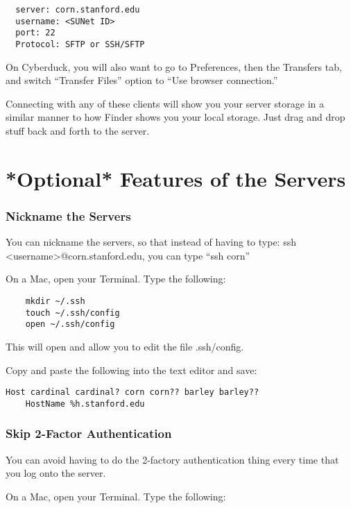 \documentclass[12pt]{article}
\begin{document}
\begin{lstlisting}
  server: corn.stanford.edu
  username: <SUNet ID>
  port: 22
  Protocol: SFTP or SSH/SFTP
\end{lstlisting}

On Cyberduck, you will also want to go to Preferences, then the Transfers tab, and switch ``Transfer Files'' option to ``Use browser connection.''

Connecting with any of these clients will show you your server storage in a similar manner to how Finder shows you your local storage. Just drag and drop stuff back and forth to the server.



\section{*Optional* Features of the Servers}


\subsubsection{Nickname the Servers}

You can nickname the servers, so that instead of having to type: ssh <username>@corn.stanford.edu, you can type ``ssh corn''

On a Mac, open your Terminal. Type the following:

\begin{lstlisting}
	mkdir ~/.ssh
	touch ~/.ssh/config
	open ~/.ssh/config
\end{lstlisting}

This will open and allow you to edit the file .ssh/config.

Copy and paste the following into the text editor and save:

\begin{lstlisting}
Host cardinal cardinal? corn corn?? barley barley??
    HostName %h.stanford.edu
\end{lstlisting}



\subsubsection{Skip 2-Factor Authentication}

You can avoid having to do the 2-factory authentication thing every time that you log onto the server.

On a Mac, open your Terminal. Type the following:
\end{document}
